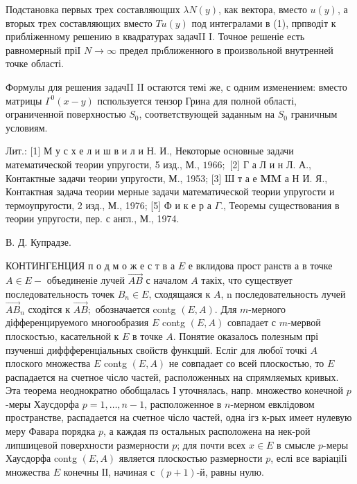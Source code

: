 \documentclass[10pt]{article}
\begin{document}
Подстановка первых трех составляющшх $\lambda N(y)$, как вектора, вместо $u(y)$, а вторых трех составляющих вместо $T u(y)$ под интегралами в (1), прпводіт к прибліженному решению в квадратурах задачII I. Точное решеніе есть равномерный пріІ $N \rightarrow \infty$ предел прıближенного в произвольной внутренней точке області.



Формулы для решения задачII II остаются темі же, с одним изменением: вместо матрицы $\Gamma^{0}(x-y)$ пспользуется тензор Грина для полной області, ограниченной поверхностью $S_{0}$, соответствующей заданным на $S_{0}$ граничным условиям.



Лит.: [1] М у с х е л и ш в и л и Н. И., Некоторые основные задачи математической теории упругости, 5 изд., М., $1966 ;$ [2] Г а Л и н Л. А., Контактные задачи теории упругости, М., 1953; [3] Ш т а е $\mathbf{M} \mathbf{M}$ а Н И. Я., Контактная задача теории мерные задачи математической теории упругости и термоупругости, 2 изд., М., 1976; [5] Ф и к е р а $\Gamma$., Теоремы существования в теории упругости, пер. с англ., М., 1974.



В. Д. Купрадзе.



КОНТИНГЕНЦИЯ п о д м о ж е с т в а $E$ е вклидова прост ранств а в точке $A \in E-$ объединеніе лучей $\overrightarrow{A B}$ с началом $A$ такіх, что существует последовательность точек $B_{n} \in E$, сходящаяся к $A$, n последовательность лучей $\overrightarrow{A B}_{n}$ сходітся к $\overrightarrow{A B} ;$ обозначается contg $(E, A)$. Для $m$-мерного діфференцируемого многообразия $E$ contg $(E, A)$ совпадает с $m$-мервоӥ плоскостью, касательной к $E$ в точке $A$. Понятие оказалось полезным прі пзученші диффференціальных свойств функцшй. Есліг для любої точкі $A$ плоского множества $E$ contg $(E, A)$ не совпадает со всей плоскостью, то $E$ распадается на счетное чісло частей, расположенных на спрямляемых кривых. Эта теорема неоднократно обобщалась І уточнялась, напр. множество конечной $p$-меры Хаусдорфа $p=1, \ldots, n-1$, расположенное в $n$-мерном евклідовом пространстве, распадается на счетное чісло частей, одна ігз к-рых имеет нулевую меру Фавара порядка $p$, а каждая пз остальных расположена на нек-рой липшицевой поверхности размерности $p$; для почти всех $x \in E$ в смысле $p$-меры Хаусдорфа contg $(E, A)$ является плоскостью размерности $p$, еслі все варіаціІі множества $E$ конечны ІІ, начиная с $(p+1)$-й, равны нулю.
\end{document}
